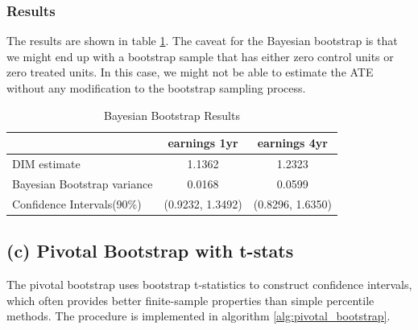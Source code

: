 \documentclass[11pt]{article}
\numberwithin{equation}{section}
\begin{document}
\subsubsection{Results}

The results are shown in table \ref{tab:bayesian_bootstrap_results}.
The caveat for the Bayesian bootstrap is that we might end up with a bootstrap sample that has either zero control units or zero treated units.
In this case, we might not be able to estimate the ATE without any modification to the bootstrap sampling process.

\begin{table}[h]
    \centering
    \begin{tabular}{lcc}
        \hline
         & earnings 1yr & earnings 4yr \\
        \hline
        DIM estimate & 1.1362  & 1.2323 \\
        Bayesian Bootstrap variance &  0.0168 & 0.0599 \\
        Confidence Intervals(90\%) & (0.9232, 1.3492) & (0.8296, 1.6350) \\
        \hline
    \end{tabular}
    \caption{\label{tab:bayesian_bootstrap_results}Bayesian Bootstrap Results}
\end{table}


\newpage


\subsection{(c) Pivotal Bootstrap with t-stats}

The pivotal bootstrap  uses bootstrap t-statistics to construct confidence intervals, which often provides better finite-sample properties than simple percentile methods.
The procedure is implemented in algorithm \ref{alg:pivotal_bootstrap}.
\end{document}
